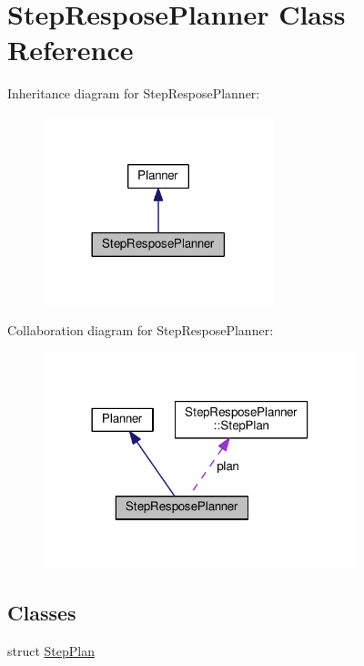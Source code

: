 \hypertarget{classStepResposePlanner}{}\section{Step\+Respose\+Planner Class Reference}
\label{classStepResposePlanner}


Inheritance diagram for Step\+Respose\+Planner\+:\nopagebreak
\begin{figure}[H]
\begin{center}
\leavevmode
\includegraphics[width=189pt]{classStepResposePlanner__inherit__graph}
\end{center}
\end{figure}


Collaboration diagram for Step\+Respose\+Planner\+:\nopagebreak
\begin{figure}[H]
\begin{center}
\leavevmode
\includegraphics[width=258pt]{classStepResposePlanner__coll__graph}
\end{center}
\end{figure}
\subsection*{Classes}
\begin{DoxyCompactItemize}
\item 
struct \hyperlink{structStepResposePlanner_1_1StepPlan}{Step\+Plan}
\end{DoxyCompactItemize}
